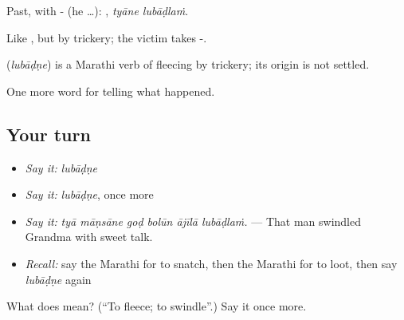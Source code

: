 Past, with - (he …):  , \emph{tyāne lubāḍlaṁ}.

Like , but by trickery; the victim takes -.

\begin{cousinweb}
\textbf{} (\emph{lubāḍṇe}) is a Marathi verb of fleecing by trickery; its origin is not settled.
\end{cousinweb}

\begin{grammarlens}[title={What you've built}]
One more word for telling what happened.
\end{grammarlens}

\subsection*{Your turn}
\begin{itemize}
\raggedright
  \item \emph{Say it:} \emph{lubāḍṇe}
  \item \emph{Say it:} \emph{lubāḍṇe}, once more
  \item \emph{Say it:} \emph{tyā māṇsāne goḍ bolūn ājīlā lubāḍlaṁ.} — That man swindled Grandma with sweet talk.
  \item \emph{Recall:} say the Marathi for to snatch, then the Marathi for to loot, then say \emph{lubāḍṇe} again
\end{itemize}

\begin{tcolorbox}[breakable,colback=teal!4,colframe=teal!35!black,title={Before you move on}]
What does  mean? (\textquotedblleft{}To fleece; to swindle\textquotedblright{}.) Say it once more.
\end{tcolorbox}
